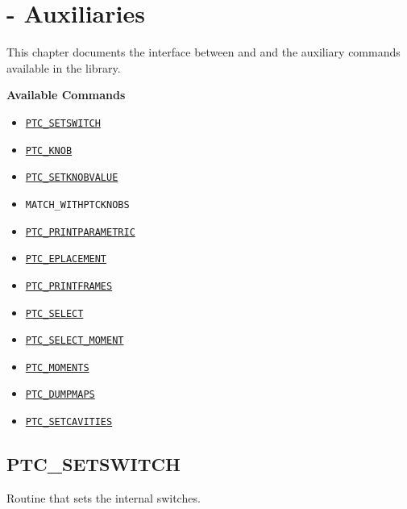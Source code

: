 
\chapter{{\madx}-{\ptc} Auxiliaries}
\label{chap:ptc_auxiliaries}

This chapter documents the interface between \madx and \ptc and the
auxiliary commands available in the \ptc library.

{\bf Available Commands }
\begin{itemize}
   \item \hyperref[sec:ptc_setswitch]{\tt PTC\_SETSWITCH}
   \item \hyperref[sec:ptc_knob]{\tt PTC\_KNOB}
   \item \hyperref[sec:ptc_setknobvalue]{\tt PTC\_SETKNOBVALUE}
   \item {\tt MATCH\_WITHPTCKNOBS}  
   \item \hyperref[sec:ptc_printparametric]{\tt PTC\_PRINTPARAMETRIC}
   \item \hyperref[sec:ptc_eplacement]{\tt PTC\_EPLACEMENT}
   \item \hyperref[sec:ptc_printframes]{\tt PTC\_PRINTFRAMES}
   \item \hyperref[sec:ptc_select]{\tt PTC\_SELECT}
   \item \hyperref[sec:ptc_select_moment]{\tt PTC\_SELECT\_MOMENT}
   \item \hyperref[sec:ptc_moments]{\tt PTC\_MOMENTS}  
   \item \hyperref[sec:ptc_dumpmaps]{\tt PTC\_DUMPMAPS}
   \item \hyperref[sec:ptc_setcavities]{\tt PTC\_SETCAVITIES}
\end{itemize}

\newpage

\section{PTC\_SETSWITCH}
\label{sec:ptc_setswitch}

Routine that sets the internal \ptc switches.

